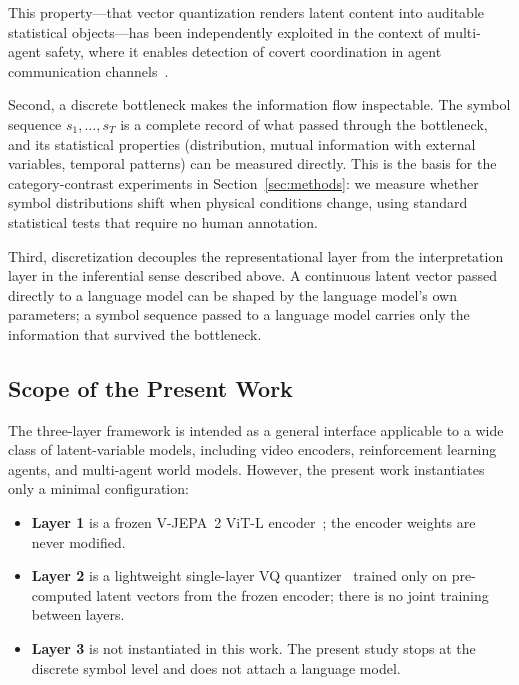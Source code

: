\documentclass{article}
\begin{document}
This property---that vector quantization renders latent content into auditable statistical objects---has been independently exploited in the context of multi-agent safety, where it enables detection of covert coordination in agent communication channels~\cite{liu2026drcb}.

Second, a discrete bottleneck makes the information flow inspectable.
The symbol sequence $s_1, \ldots, s_T$ is a complete record of what
passed through the bottleneck, and its statistical properties
(distribution, mutual information with external variables, temporal
patterns) can be measured directly.
This is the basis for the category-contrast experiments in
Section~\ref{sec:methods}: we measure whether symbol distributions
shift when physical conditions change, using standard statistical
tests that require no human annotation.

Third, discretization decouples the representational layer from the
interpretation layer in the inferential sense described above.
A continuous latent vector passed directly to a language model can be
shaped by the language model's own parameters; a symbol sequence
passed to a language model carries only the information that survived
the bottleneck.

\subsection{Scope of the Present Work}
\label{sec:scope}

The three-layer framework is intended as a general interface
applicable to a wide class of latent-variable models, including video
encoders, reinforcement learning agents, and multi-agent world models.
However, the present work instantiates only a minimal configuration:

\begin{itemize}
  \item \textbf{Layer 1} is a frozen V-JEPA~2 ViT-L
    encoder~\cite{assran2025vjepa2}; the encoder weights are never
    modified.
  \item \textbf{Layer 2} is a lightweight single-layer VQ
    quantizer~\cite{vandenoord2017vqvae} trained only on
    pre-computed latent vectors from the frozen encoder; there is no
    joint training between layers.
  \item \textbf{Layer 3} is not instantiated in this work.
    The present study stops at the discrete symbol level and does not
    attach a language model.
\end{itemize}
\end{document}
